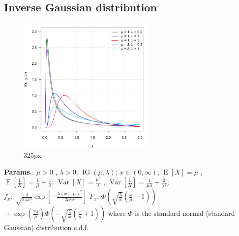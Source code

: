     
        
\subsection{Inverse Gaussian distribution}


    \begin{figure}[H]
        \centering
        \includegraphics[width=0.6\textwidth]{images/Inverse Gaussian Probability Densitiy Function.png}
        \caption{325px}
    \end{figure}




    {\color{darkblue} \textbf{Params.}:} {$\mu > 0$ ,  $\lambda > 0$}; {$\operatorname{IG}\left(\mu, \lambda\right)$}; {$ x \in (0,\infty)$}; {$\operatorname{E}[X] = \mu $ ,  $\operatorname{E}[\frac{1}{X}] = \frac{1}{\mu} + \frac{1}{\lambda}$}; {$\operatorname{Var}[ X] = \frac{\mu^3}{\lambda} $ ,  $\operatorname{Var}[\frac{1}{X}] = \frac{1}{\mu \lambda} + \frac{2}{\lambda^2}$};\hspace{0.5cm}\\{\color{darkblue} \textbf{$f_x$}:} {$ \sqrt\frac{\lambda}{2 \pi x^3} \exp\left[-\frac{\lambda (x-\mu)^2}{2 \mu^2 x}\right]$}{\color{darkblue} \textbf{$F_x$}:} {$ \Phi\left(\sqrt{\frac{\lambda}{x}} \left(\frac{x}{\mu}-1 \right)\right) $  ${}+\exp\left(\frac{2 \lambda}{\mu}\right) \Phi\left(-\sqrt{\frac{\lambda}{x}}\left(\frac{x}{\mu}+1 \right)\right)  $ where $ \Phi $ is the standard normal (standard Gaussian) distribution c.d.f.}



